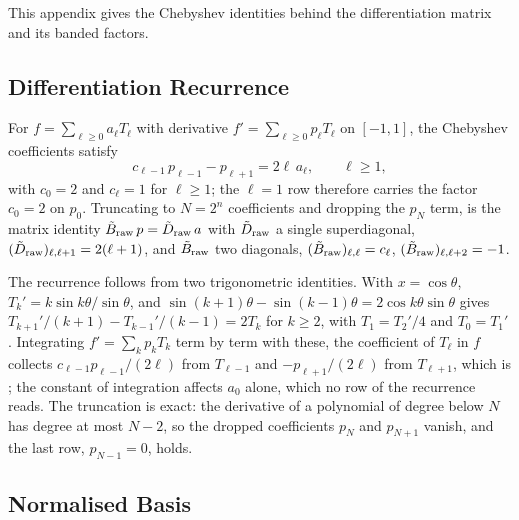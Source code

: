 This appendix gives the Chebyshev identities behind the differentiation matrix and its banded factors.

\subsection{Differentiation Recurrence}

For $f = \sum_{\ell\ge 0} a_\ell T_\ell$ with derivative $f' = \sum_{\ell\ge 0} p_\ell T_\ell$ on
$[-1,1]$, the Chebyshev coefficients satisfy
\begin{equation}
    c_{\ell-1}\,p_{\ell-1} - p_{\ell+1} = 2\ell\,a_\ell , \qquad \ell \ge 1 ,
    \label{eq:app-cheb-recurrence}
\end{equation}
with $c_0 = 2$ and $c_\ell = 1$ for $\ell \ge 1$; the $\ell = 1$ row therefore carries the
factor $c_0 = 2$ on $p_0$. Truncating to $N = 2^n$ coefficients and dropping the
$p_N$ term,  is the matrix identity
$\tilde{B}_{\mathrm{raw}}\,p = \tilde{D}_{\mathrm{raw}}\,a$ with
$\tilde{D}_{\mathrm{raw}}$ a single superdiagonal, $(\tilde{D}_{\mathrm{raw}})_{\ell,\ell+1} = 2(\ell+1)$,
and $\tilde{B}_{\mathrm{raw}}$ two diagonals,
$(\tilde{B}_{\mathrm{raw}})_{\ell,\ell} = c_\ell$, $(\tilde{B}_{\mathrm{raw}})_{\ell,\ell+2} = -1$.

The recurrence follows from two trigonometric identities. With $x=\cos\theta$, $T_k'=k\sin k\theta/\sin\theta$, and $\sin(k+1)\theta-\sin(k-1)\theta=2\cos k\theta\sin\theta$ gives $T_{k+1}'/(k+1)-T_{k-1}'/(k-1)=2T_k$ for $k\ge2$, with $T_1=T_2'/4$ and $T_0=T_1'$. Integrating $f'=\sum_kp_kT_k$ term by term with these, the coefficient of $T_\ell$ in $f$ collects $c_{\ell-1}p_{\ell-1}/(2\ell)$ from $T_{\ell-1}$ and $-p_{\ell+1}/(2\ell)$ from $T_{\ell+1}$, which is ; the constant of integration affects $a_0$ alone, which no row of the recurrence reads. The truncation is exact: the derivative of a polynomial of degree below $N$ has degree at most $N-2$, so the dropped coefficients $p_N$ and $p_{N+1}$ vanish, and the last row, $p_{N-1}=0$, holds.

\subsection{Normalised Basis}

